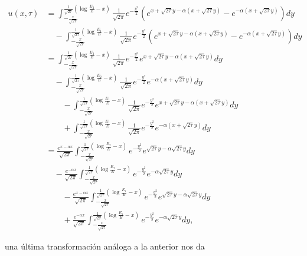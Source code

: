 \documentclass[letter]{article}
\begin{document}
\begin{enumerate}
\begin{enumerate}[label=\alph*)]
\begin{align*}
    u(x,\tau) &= \int_{-\frac{x}{\sqrt{2\tau}}}^{\frac{1}{\sqrt{2\tau}}\left(\log\frac{E_2}{E} - x\right)} \frac{1}{\sqrt{2\pi}}e^{-\frac{y^2}{2}}(e^{x + \sqrt{2\tau}y - \alpha(x + \sqrt{2\tau}y)} - e^{-\alpha(x + \sqrt{2\tau}y)})dy\\
    &\quad - \int_{-\frac{x}{\sqrt{2\tau}}}^{\frac{1}{\sqrt{2\tau}}\left(\log\frac{E_1}{E} - x\right)} \frac{1}{\sqrt{2\pi}}e^{-\frac{y^2}{2}}(e^{x + \sqrt{2\tau}y - \alpha(x + \sqrt{2\tau}y)} - e^{-\alpha(x + \sqrt{2\tau}y)})dy\\
    &= \int_{-\frac{x}{\sqrt{2\tau}}}^{\frac{1}{\sqrt{2\tau}}\left(\log\frac{E_2}{E} - x\right)} \frac{1}{\sqrt{2\pi}}e^{-\frac{y^2}{2}}e^{x + \sqrt{2\tau}y - \alpha(x + \sqrt{2\tau}y)}dy\\
    &\quad - \int_{-\frac{x}{\sqrt{2\tau}}}^{\frac{1}{\sqrt{2\tau}}\left(\log\frac{E_2}{E} - x\right)} \frac{1}{\sqrt{2\pi}}e^{-\frac{y^2}{2}}e^{-\alpha(x + \sqrt{2\tau}y)}dy\\
    &\qquad - \int_{-\frac{x}{\sqrt{2\tau}}}^{\frac{1}{\sqrt{2\tau}}\left(\log\frac{E_1}{E} - x\right)} \frac{1}{\sqrt{2\pi}}e^{-\frac{y^2}{2}}e^{x + \sqrt{2\tau}y - \alpha(x + \sqrt{2\tau}y)}dy\\
    &\qquad + \int_{-\frac{x}{\sqrt{2\tau}}}^{\frac{1}{\sqrt{2\tau}}\left(\log\frac{E_1}{E} - x\right)} \frac{1}{\sqrt{2\pi}}e^{-\frac{y^2}{2}}e^{-\alpha(x + \sqrt{2\tau}y)}dy\\
    &= \frac{e^{x - \alpha x}}{\sqrt{2\pi}} \int_{-\frac{x}{\sqrt{2\tau}}}^{\frac{1}{\sqrt{2\tau}}\left(\log\frac{E_2}{E} - x\right)} e^{-\frac{y^2}{2}}e^{\sqrt{2\tau}y - \alpha\sqrt{2\tau}y}dy\\
    &\quad - \frac{e^{-\alpha x}}{\sqrt{2\pi}}\int_{-\frac{x}{\sqrt{2\tau}}}^{\frac{1}{\sqrt{2\tau}}\left(\log\frac{E_2}{E} - x\right)} e^{-\frac{y^2}{2}}e^{-\alpha\sqrt{2\tau}y}dy\\
    &\qquad - \frac{e^{x - \alpha x}}{\sqrt{2\pi}} \int_{-\frac{x}{\sqrt{2\tau}}}^{\frac{1}{\sqrt{2\tau}}\left(\log\frac{E_1}{E} - x\right)} e^{-\frac{y^2}{2}}e^{\sqrt{2\tau}y - \alpha\sqrt{2\tau}y}dy\\
    &\qquad + \frac{e^{-\alpha x}}{\sqrt{2\pi}} \int_{-\frac{x}{\sqrt{2\tau}}}^{\frac{1}{\sqrt{2\tau}}\left(\log\frac{E_1}{E} - x\right)} e^{-\frac{y^2}{2}}e^{-\alpha\sqrt{2\tau}y}dy,
\end{align*}

una última transformación análoga a la anterior nos da


\end{enumerate}
\end{enumerate}
\end{document}
